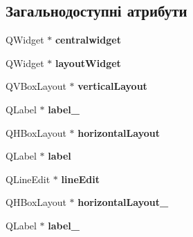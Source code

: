 \subsection*{Загальнодоступні атрибути}
\begin{DoxyCompactItemize}
\item 
\hypertarget{classUi__MainWindow_a356f1cf3ebda15f1fac59467ee081b74}{Q\-Widget $\ast$ {\bfseries centralwidget}}\label{classUi__MainWindow_a356f1cf3ebda15f1fac59467ee081b74}

\item 
\hypertarget{classUi__MainWindow_ab96ab0f0578098521fa69a75aa5cdde8}{Q\-Widget $\ast$ {\bfseries layout\-Widget}}\label{classUi__MainWindow_ab96ab0f0578098521fa69a75aa5cdde8}

\item 
\hypertarget{classUi__MainWindow_aecd96a04789fcfec3f98d80390ad8184}{Q\-V\-Box\-Layout $\ast$ {\bfseries vertical\-Layout}}\label{classUi__MainWindow_aecd96a04789fcfec3f98d80390ad8184}

\item 
\hypertarget{classUi__MainWindow_a0376fd90247280e7c7957cc70628708c}{Q\-Label $\ast$ {\bfseries label\-\_}}\label{classUi__MainWindow_a0376fd90247280e7c7957cc70628708c}

\item 
\hypertarget{classUi__MainWindow_acd6fdc9ebacc4b25b834162380d75ce8}{Q\-H\-Box\-Layout $\ast$ {\bfseries horizontal\-Layout}}\label{classUi__MainWindow_acd6fdc9ebacc4b25b834162380d75ce8}

\item 
\hypertarget{classUi__MainWindow_ad9c89133780f28e6efa2ec17ceb9cff5}{Q\-Label $\ast$ {\bfseries label}}\label{classUi__MainWindow_ad9c89133780f28e6efa2ec17ceb9cff5}

\item 
\hypertarget{classUi__MainWindow_a7a5b9a4633d64f502ce81da3202d828c}{Q\-Line\-Edit $\ast$ {\bfseries line\-Edit}}\label{classUi__MainWindow_a7a5b9a4633d64f502ce81da3202d828c}

\item 
\hypertarget{classUi__MainWindow_a80867018070156432923d0266cc9fe25}{Q\-H\-Box\-Layout $\ast$ {\bfseries horizontal\-Layout\-\_}}\label{classUi__MainWindow_a80867018070156432923d0266cc9fe25}

\item 
\hypertarget{classUi__MainWindow_a2e2516d755e4dd53fc905dabddf2738a}{Q\-Label $\ast$ {\bfseries label\-\_}}\label{classUi__MainWindow_a2e2516d755e4dd53fc905dabddf2738a}


\end{DoxyCompactItemize}
